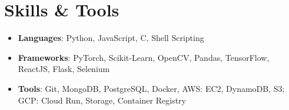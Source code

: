 \documentclass[letterpaper,11pt]{article}
\newcommand{\resumeSubHeadingListStart}{\begin{itemize}[leftmargin=*]}
\newcommand{\resumeSubHeadingListEnd}{\end{itemize}}
\begin{document}
\section{Skills \& Tools}
  \resumeSubHeadingListStart
    \item{
      \textbf{Languages}{: Python, JavaScript, C, Shell Scripting}
    }
    \item{
      \textbf{Frameworks}{: PyTorch, Scikit-Learn, OpenCV, Pandas, TensorFlow, ReactJS, Flask, Selenium}
    }
    \item{
      \textbf{Tools}{: Git, MongoDB, PostgreSQL, Docker, AWS: EC2, DynamoDB, S3; GCP: Cloud Run, Storage, Container Registry}
    }
  \resumeSubHeadingListEnd


\end{document}
